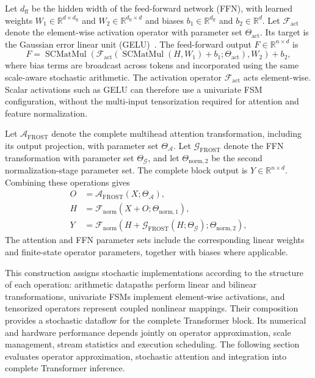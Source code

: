 \documentclass[pdflatex,sn-mathphys-num]{sn-jnl}
\theoremstyle{thmstyleone}
\theoremstyle{thmstyletwo}
\theoremstyle{thmstylethree}
\begin{document}
Let $d_{\mathrm{ff}}$ be the hidden width of the feed-forward network (FFN), with learned weights $W_1\in\mathbb{R}^{d\times d_{\mathrm{ff}}}$ and $W_2\in\mathbb{R}^{d_{\mathrm{ff}}\times d}$ and biases $b_1\in\mathbb{R}^{d_{\mathrm{ff}}}$ and $b_2\in\mathbb{R}^{d}$. Let $\mathcal{F}_{\mathrm{act}}$ denote the element-wise activation operator with parameter set $\Theta_{\mathrm{act}}$. Its target is the Gaussian error linear unit (GELU)~\cite{hendrycks2016gelu}. The feed-forward output $F\in\mathbb{R}^{n\times d}$ is
\begin{equation}
F = \operatorname{SCMatMul} \left( \mathcal{F}_{\mathrm{act}} \left( \operatorname{SCMatMul}(H,W_1)+b_1; \Theta_{\mathrm{act}} \right), W_2 \right) + b_2, \label{eq:frost_ffn}
\end{equation}
where bias terms are broadcast across tokens and incorporated using the same scale-aware stochastic arithmetic. The activation operator $\mathcal{F}_{\mathrm{act}}$ acts element-wise. Scalar activations such as GELU can therefore use a univariate FSM configuration, without the multi-input tensorization required for attention and feature normalization.

Let $\mathcal{A}_{\mathrm{FROST}}$ denote the complete multihead attention transformation, including its output projection, with parameter set $\Theta_{\mathcal{A}}$. Let $\mathcal{G}_{\mathrm{FROST}}$ denote the FFN transformation with parameter set $\Theta_{\mathcal{G}}$, and let $\Theta_{\mathrm{norm},2}$ be the second normalization-stage parameter set. The complete block output is $Y\in\mathbb{R}^{n\times d}$. Combining these operations gives
\begin{align}
O
&=
\mathcal{A}_{\mathrm{FROST}}
\left(
X;\Theta_{\mathcal{A}}
\right),
\label{eq:frost_block_attention}
\\
H
&=
\mathcal{F}_{\mathrm{norm}}
\left(
X+O;\Theta_{\mathrm{norm},1}
\right),
\label{eq:frost_block_norm1}
\\
Y
&=
\mathcal{F}_{\mathrm{norm}}
\left(
H+
\mathcal{G}_{\mathrm{FROST}}
\left(
H;\Theta_{\mathcal{G}}
\right);
\Theta_{\mathrm{norm},2}
\right),
\label{eq:frost_block_output}
\end{align}
The attention and FFN parameter sets include the corresponding linear weights and finite-state operator parameters, together with biases where applicable.

This construction assigns stochastic implementations according to the structure of each operation: arithmetic datapaths perform linear and bilinear transformations, univariate FSMs implement element-wise activations, and tensorized operators represent coupled nonlinear mappings. Their composition provides a stochastic dataflow for the complete Transformer block. Its numerical and hardware performance depends jointly on operator approximation, scale management, stream statistics and execution scheduling. The following section evaluates operator approximation, stochastic attention and integration into complete Transformer inference.
\end{document}
